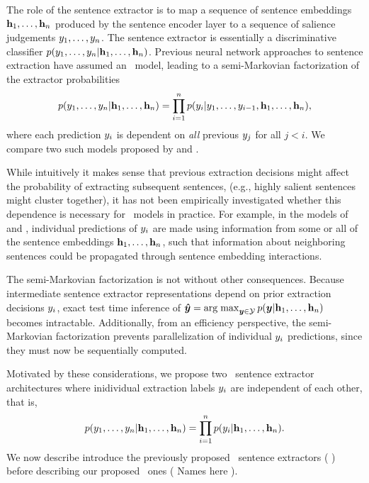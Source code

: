 The role of the sentence extractor is to map a sequence of sentence 
embeddings 
    $\mathbf{h}_1,\ldots,\mathbf{h}_n$ %
produced by the sentence encoder layer to a sequence of salience judgements 
    $y_1,\ldots, y_n$. %
The sentence extractor is essentially a discriminative classifier 
   $p(y_1,\ldots, y_n | \mathbf{h}_1, \ldots, \mathbf{h}_n)$.
Previous neural network approaches to sentence extraction have assumed 
an \autoregressive~model, leading to a semi-Markovian factorization of the 
extractor probabilities 
  \[p(y_{1},\ldots,y_n|\mathbf{h}_1,\ldots,\mathbf{h}_n)=
      \prod_{i=1}^n 
        p(y_i|y_1,\ldots,y_{i-1},\mathbf{h}_1,\ldots,\mathbf{h}_n),\]
where each prediction $y_i$ is dependent on 
\emph{all} 
previous $y_j$ for
all $j < i$. We compare two such models proposed by \citet{cheng2016neural}
and \citet{nallapati2017summarunner}. 

While intuitively it makes sense that previous extraction decisions might 
affect the probability of extracting subsequent sentences, (e.g., highly 
salient sentences might cluster together), it has not been empirically 
investigated whether this dependence is necessary for \deeplearning~models in 
practice. For example, in the models of 
\citet{cheng2016neural} and \citet{nallapati2017summarunner}, individual
predictions of $y_i$ are made using information from some or all of 
the sentence embeddings $\mathbf{h}_1, \ldots, \mathbf{h}_n$, such that 
information about neighboring sentences could be propagated through sentence
embedding interactions. 

The semi-Markovian factorization is not without
other consequences. Because intermediate sentence extractor representations
depend on prior extraction decisions $y_i$, exact test time inference of
$\boldsymbol{\hat{y}} = \operatorname{arg\;max}_{\boldsymbol{y} \in \mathcal{Y}} 
p(\boldsymbol{y}|\mathbf{h}_1,\ldots,\mathbf{h}_n)$
becomes intractable. Additionally, from an efficiency perspective, 
the semi-Markovian factorization prevents parallelization of individual
$y_i$ predictions, since they must now be sequentially computed.

Motivated by these considerations, we propose two \nonautoregressive~sentence
extractor architectures where inidividual extraction labels $y_i$ 
are independent of each other, that is, 
\[p(y_1,\ldots,y_n|\mathbf{h}_1,\ldots,\mathbf{h}_n) = \prod_{i=1}^n 
p(y_i|\mathbf{h}_1,\ldots,\mathbf{h}_n).\]
We now describe introduce the
previously proposed \autoregressive~sentence extractors ( ) before describing
our proposed \nonautoregressive~ones ({\color{red} Names here} ).


